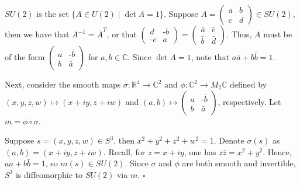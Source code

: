 \documentclass{article}
\newcommand{\R}{\mathbb{R}}
\newcommand{\C}{\mathbb{C}}
\begin{document}
  $SU(2)$ is the set $\{A\in U(2)\mid\det A = 1\}$. Suppose $A=
  \left(
    \begin{smallmatrix}
      a   &   b\\
      c   &   d
    \end{smallmatrix}
  \right)\in SU(2)$, then we have that $A^{-1}=\bar{A}^T$, or that
  $
  \left(
    \begin{smallmatrix}
      d           &   \text{-}b\\
      \text{-}c   &   a
    \end{smallmatrix}
  \right) =
  \left(
    \begin{smallmatrix}
      \bar{a}&\bar{c}\\
      \bar{b}&\bar{d}
    \end{smallmatrix}
  \right)
  $. Thus, $A$ must be of the form $
  \left(
    \begin{smallmatrix}
      a & \text{-}\bar{b}\\
      b & \bar{a}
    \end{smallmatrix}
  \right)
  $ for $a,b\in\C$. Since $\det A=1$, note that $a\bar{a}+b\bar{b}=1$.

  Next, consider the smooth maps $\sigma\colon\R^4\to\C^2$ and $\phi\colon\C^2
  \to M_2\C$ defined by $(x,y,z,w)\mapsto(x+iy, z+iw)$ and $(a,b)\mapsto
  \left(
    \begin{smallmatrix}
      a & \text{-}\bar{b}\\
      b & \bar{a}
    \end{smallmatrix}
  \right)$, respectively. Let $m=\phi\circ\sigma$.

  Suppose $s=(x,y,z,w)\in S^3$, then $x^2+y^2+z^2+w^2=1$. Denote $\sigma(s)$ as
  $(a,b)=(x+iy,z+iw)$. Recall, for $z=x+iy$, one has $z\bar{z}=x^2+y^2$. Hence,
  $a\bar{a}+b\bar{b}=1$, so $m(s)\in SU(2)$. Since $\sigma$ and $\phi$ are both
  smooth and invertible, $S^3$ is diffeomorphic to $SU(2)$ via $m$.
  \hfill $\square$
\end{document}
